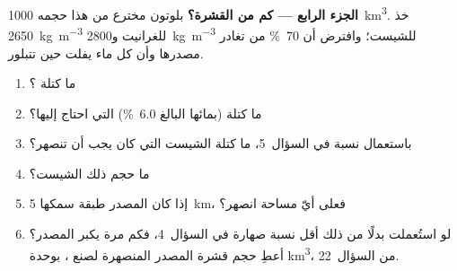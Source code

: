 \begin{problem}
\noindent\textbf{الجزء الرابع --- كم من القشرة؟}
بلوتون مخترع من هذا  حجمه \qty{1000}{\cubic\kilo\metre}.
خذ \qty{2650}{\kilogram\per\cubic\metre} للغرانيت
و\qty{2800}{\kilogram\per\cubic\metre} للشيست؛ وافترض أن \qty{70}{\percent} من
 تغادر مصدرها وأن كل ماء  يفلت حين تتبلور.
\begin{enumerate}[resume]
\item ما كتلة ؟
\item ما كتلة  (بمائها البالغ \qty{6.0}{\percent}) التي احتاج إليها؟
\item باستعمال نسبة  في السؤال~5، ما كتلة الشيست التي كان يجب أن تنصهر؟
\item ما حجم ذلك الشيست؟
\item إذا كان المصدر طبقة سمكها \qty{5}{km}، فعلى أيّ مساحة انصهر؟
\item لو استُعملت بدلًا من ذلك أقل نسبة صهارة في السؤال~4، فكم مرة يكبر
المصدر؟ أعطِ حجم قشرة المصدر المنصهرة لصنع ، بوحدة
\unit{\cubic\kilo\metre}، من السؤال~22.
\end{enumerate}
\end{problem}
